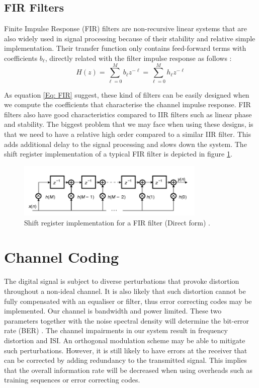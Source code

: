 \documentclass[12pt,a4paper,openright]{report}
\begin{document}
\subsection{FIR Filters}
Finite Impulse Response (FIR) filters are non-recursive linear systems that are also widely used in signal processing because of their stability and relative simple implementation. Their transfer function only contains feed-forward terms with coefficients $b_\ell$, directly related with the filter impulse response as follows \cite{DSPDiniz}: 
\begin{equation}\label{Eq: FIR}
H\left( z \right) = \sum\limits_{\ell  = 0}^M {{b_\ell }{z^{ - \ell }}}=\sum\limits_{\ell  = 0}^M {{h_\ell }{z^{ - \ell }}}
\end{equation}

As equation \ref{Eq: FIR} suggest, these kind of filters can be easily designed when we compute the coefficients that characterise the channel impulse response. FIR filters also have good characteristics compared to IIR filters such as linear phase and stability. The biggest problem that we may face when using these designs, is that we need to have a relative high order compared to a similar IIR filter. This adds additional delay to the signal processing and slows down the system. The shift register implementation of a typical FIR filter is depicted in figure \ref{fig:FIRfilter}.
 
  \begin{figure}[H]
   \centering
     \includegraphics[width=0.8\textwidth]{FIRfilter.png}
     \caption[Shift register implementation for a FIR filter]{Shift register implementation for a FIR filter (Direct form) \cite{DSPDiniz}.}
     \label{fig:FIRfilter}
 \end{figure}  

\section{Channel Coding}
\label{sec:channcod}
The digital signal is subject to diverse perturbations that provoke distortion throughout a non-ideal channel. It is also likely that such distortion  cannot be fully compensated with an equaliser or filter, thus error correcting codes may be implemented. Our channel is bandwidth and power limited. These two parameters together with the noise spectral density will determine the bit-error rate (BER) \cite{HaykinBook}. The channel impairments in our system  result in frequency distortion and ISI. An orthogonal  modulation scheme may be able to mitigate such perturbations. However, it is still likely to have errors at the receiver that can be corrected by adding redundancy to the transmitted signal. This implies that the overall information rate will be decreased when using overheads such as training sequences or error correcting codes.
 
\end{document}
